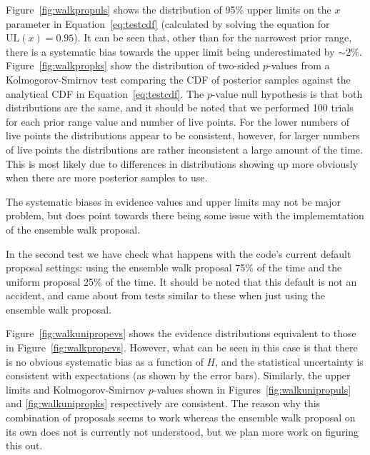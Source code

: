 Figure~\ref{fig:walkpropuls} shows the distribution of 95\% upper limits on the $x$ parameter in Equation~\ref{eq:testcdf} (calculated by solving
the equation for $\text{UL}(x) = 0.95$). It can be seen that, other than for the narrowest prior range, there is a systematic bias towards the
upper limit being underestimated by $\sim 2\%$. Figure~\ref{fig:walkpropks} show the distribution of two-sided $p$-values from a Kolmogorov-Smirnov
test comparing the CDF of posterior samples against the analytical CDF in Equation~\ref{eq:testcdf}. The $p$-value null hypothesis is that both
distributions are the same, and it should be noted that we performed 100 trials for each prior range value and number of live points. For the
lower numbers of live points the distributions appear to be consistent, however, for larger numbers of live points the distributions are rather
inconsistent a large amount of the time. This is most likely due to differences in distributions showing up more obviously when there are more
posterior samples to use.

The systematic biases in evidence values and upper limits may not be major problem, but does point towards there being some issue with the
implememtation of the ensemble walk proposal.

In the second test we have check what happens with the code's current default proposal settings: using the ensemble walk proposal 75\%
of the time and the uniform proposal 25\% of the time. It should be noted that this default is not an accident, and came about from tests
similar to these when just using the ensemble walk proposal.

Figure~\ref{fig:walkunipropevs} shows the evidence distributions equivalent to those in Figure~\ref{fig:walkpropevs}. However, what can
be seen in this case is that there is no obvious systematic bias as a function of $H$, and the statistical uncertainty is
consistent with expectations (as shown by the error bars). Similarly, the upper limits and Kolmogorov-Smirnov $p$-values shown in
Figures~\ref{fig:walkunipropuls} and \ref{fig:walkunipropks} respectively are consistent. The reason why this combination of proposals
seems to work whereas the ensemble walk proposal on its own does not is currently not understood, but we plan more work on figuring this
out.

